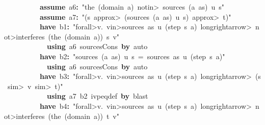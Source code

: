 \documentclass{article}
\newcommand{\syntaxKEYWORDA}[1]{\textcolor[rgb]{0.0,0.4,0.6}{\textbf{#1}}}
\newcommand{\syntaxKEYWORDC}[1]{\textcolor[rgb]{0.0,0.6,1.0}{\textbf{#1}}}
\newcommand{\syntaxLITERALA}[1]{\textcolor[rgb]{1.0,0.0,0.8}{#1}}
\newcommand{\syntaxOPERATOR}[1]{\textcolor[rgb]{0.0,0.0,0.0}{\textbf{#1}}}
\newcommand{\syntaxKEYWORDA}[1]{\textcolor[rgb]{0.0,0.4,0.6}{\textbf{#1}}}
\newcommand{\syntaxKEYWORDC}[1]{\textcolor[rgb]{0.0,0.6,1.0}{\textbf{#1}}}
\newcommand{\syntaxLITERALA}[1]{\textcolor[rgb]{1.0,0.0,0.8}{#1}}
\newcommand{\syntaxOPERATOR}[1]{\textcolor[rgb]{0.0,0.0,0.0}{\textbf{#1}}}
\newcommand{\syntaxKEYWORDA}[1]{\textcolor[rgb]{0.0,0.4,0.6}{\textbf{#1}}}
\newcommand{\syntaxKEYWORDC}[1]{\textcolor[rgb]{0.0,0.6,1.0}{\textbf{#1}}}
\newcommand{\syntaxLITERALA}[1]{\textcolor[rgb]{1.0,0.0,0.8}{#1}}
\newcommand{\syntaxOPERATOR}[1]{\textcolor[rgb]{0.0,0.0,0.0}{\textbf{#1}}}
\newcommand{\syntaxKEYWORDA}[1]{\textcolor[rgb]{0.0,0.4,0.6}{#1}}
\newcommand{\syntaxKEYWORDC}[1]{\textcolor[rgb]{0.0,0.6,1.0}{#1}}
\newcommand{\syntaxLITERALA}[1]{\textcolor[rgb]{1.0,0.0,0.8}{\textbf{#1}}}
\newcommand{\syntaxOPERATOR}[1]{\textcolor[rgb]{0.0,0.0,0.0}{#1}}
\newcommand{\syntaxKEYWORDA}[1]{\textcolor[rgb]{0.0,0.4,0.6}{\textbf{#1}}}
\newcommand{\syntaxKEYWORDC}[1]{\textcolor[rgb]{0.0,0.6,1.0}{\textbf{#1}}}
\newcommand{\syntaxLITERALA}[1]{\textcolor[rgb]{1.0,0.0,0.8}{#1}}
\newcommand{\syntaxOPERATOR}[1]{\textcolor[rgb]{0.0,0.0,0.0}{\textbf{#1}}}
\newcommand{\syntaxKEYWORDA}[1]{\textcolor[rgb]{0.0,0.4,0.6}{\textbf{#1}}}
\newcommand{\syntaxKEYWORDC}[1]{\textcolor[rgb]{0.0,0.6,1.0}{\textbf{#1}}}
\newcommand{\syntaxLITERALA}[1]{\textcolor[rgb]{1.0,0.0,0.8}{#1}}
\newcommand{\syntaxOPERATOR}[1]{\textcolor[rgb]{0.0,0.0,0.0}{\textbf{#1}}}
\begin{document}
{\ }{\ }{\ }{\ }{\ }{\ }{\ }{\ }{\ }{\ }\syntaxKEYWORDC{assume}{\ }a6\syntaxOPERATOR{:}{\ }\syntaxLITERALA{"the{\ }(domain{\ }a){\ }\<notin>{\ }sources{\ }(a{\ }\usebox{\hashbox}{\ }as){\ }u{\ }s"}\hspace*{\fill}\\
{\ }{\ }{\ }{\ }{\ }{\ }{\ }{\ }{\ }{\ }\syntaxKEYWORDC{assume}{\ }a7\syntaxOPERATOR{:}{\ }\syntaxLITERALA{"(s{\ }\<approx>{\ }(sources{\ }(a{\ }\usebox{\hashbox}{\ }as){\ }u{\ }s){\ }\<approx>{\ }t)"}\hspace*{\fill}\\
{\ }{\ }{\ }{\ }{\ }{\ }{\ }{\ }{\ }{\ }\syntaxKEYWORDA{have}{\ }b1\syntaxOPERATOR{:}{\ }\syntaxLITERALA{"\<forall>v.{\ }v\<in>sources{\ }as{\ }u{\ }(step{\ }s{\ }a){\ }\<longrightarrow>{\ }\<not>interferes{\ }(the{\ }(domain{\ }a)){\ }s{\ }v"}\hspace*{\fill}\\
{\ }{\ }{\ }{\ }{\ }{\ }{\ }{\ }{\ }{\ }{\ }{\ }\syntaxKEYWORDA{using}{\ }a6{\ }sources\usebox{\underscorebox}Cons{\ }\syntaxKEYWORDA{by}{\ }auto\hspace*{\fill}\\
{\ }{\ }{\ }{\ }{\ }{\ }{\ }{\ }{\ }{\ }\syntaxKEYWORDA{have}{\ }b2\syntaxOPERATOR{:}{\ }\syntaxLITERALA{"sources{\ }(a{\ }\usebox{\hashbox}{\ }as){\ }u{\ }s{\ }={\ }sources{\ }as{\ }u{\ }(step{\ }s{\ }a)"}\hspace*{\fill}\\
{\ }{\ }{\ }{\ }{\ }{\ }{\ }{\ }{\ }{\ }{\ }{\ }\syntaxKEYWORDA{using}{\ }a6{\ }sources\usebox{\underscorebox}Cons{\ }\syntaxKEYWORDA{by}{\ }auto\hspace*{\fill}\\
{\ }{\ }{\ }{\ }{\ }{\ }{\ }{\ }{\ }{\ }\syntaxKEYWORDA{have}{\ }b3\syntaxOPERATOR{:}{\ }\syntaxLITERALA{"\<forall>v.{\ }v\<in>sources{\ }as{\ }u{\ }(step{\ }s{\ }a){\ }\<longrightarrow>{\ }(s{\ }\<sim>{\ }v{\ }\<sim>{\ }t)"}\hspace*{\fill}\\
{\ }{\ }{\ }{\ }{\ }{\ }{\ }{\ }{\ }{\ }{\ }{\ }\syntaxKEYWORDA{using}{\ }a7{\ }b2{\ }ivpeq\usebox{\underscorebox}def{\ }\syntaxKEYWORDA{by}{\ }blast\hspace*{\fill}\\
{\ }{\ }{\ }{\ }{\ }{\ }{\ }{\ }{\ }{\ }\syntaxKEYWORDA{have}{\ }b4\syntaxOPERATOR{:}{\ }\syntaxLITERALA{"\<forall>v.{\ }v\<in>sources{\ }as{\ }u{\ }(step{\ }s{\ }a){\ }\<longrightarrow>{\ }\<not>interferes{\ }(the{\ }(domain{\ }a)){\ }t{\ }v"}\hspace*{\fill}\\
\end{document}
